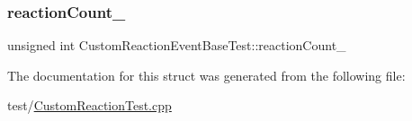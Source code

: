 \subsubsection{\texorpdfstring{reaction\+Count\+\_\+}{reactionCount\_}}
{\footnotesize\ttfamily unsigned int Custom\+Reaction\+Event\+Base\+Test\+::reaction\+Count\+\_\+\hspace{0.3cm}{\ttfamily [private]}}



The documentation for this struct was generated from the following file\+:\begin{DoxyCompactItemize}
\item 
test/\mbox{\hyperlink{_custom_reaction_test_8cpp}{Custom\+Reaction\+Test.\+cpp}}\end{DoxyCompactItemize}
